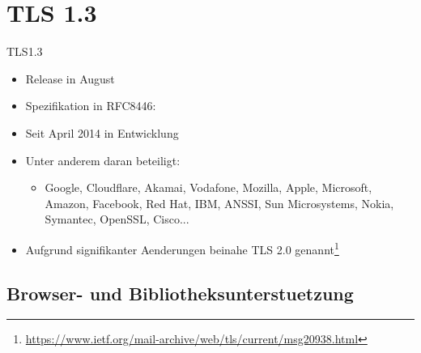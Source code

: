 \documentclass{f4_beamer_metropolis}
\begin{document}
\section{TLS 1.3}

\begin{frame}{TLS1.3}
  \begin{itemize}
    \item Release in August \citeyear{RFC8446}
    \item Spezifikation in RFC8446: \textit{}
    \item Seit April 2014 in Entwicklung
    \item Unter anderem daran beteiligt:
    \begin{itemize}
      \item Google, Cloudflare, Akamai, Vodafone, Mozilla, Apple, Microsoft, Amazon, Facebook, Red Hat, IBM, ANSSI, Sun Microsystems, Nokia, Symantec, OpenSSL, Cisco...
    \end{itemize}
    \item Aufgrund signifikanter Aenderungen beinahe TLS 2.0 genannt\footnote{\url{https://www.ietf.org/mail-archive/web/tls/current/msg20938.html}}
  \end{itemize}

\end{frame}


\subsection{Browser- und Bibliotheksunterstuetzung}
\end{document}
